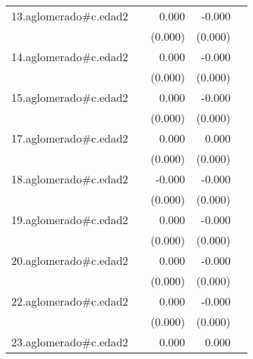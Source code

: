 {\begin{longtable}{l*{4}{D{.}{.}{-1}}}
\addlinespace
13.aglomerado#c.edad2&                     &       0.000         &      -0.000         &                     \\
            &                     &     (0.000)         &     (0.000)         &                     \\
\addlinespace
14.aglomerado#c.edad2&                     &       0.000\sym{*}  &      -0.000         &                     \\
            &                     &     (0.000)         &     (0.000)         &                     \\
\addlinespace
15.aglomerado#c.edad2&                     &       0.000         &      -0.000         &                     \\
            &                     &     (0.000)         &     (0.000)         &                     \\
\addlinespace
17.aglomerado#c.edad2&                     &       0.000         &       0.000         &                     \\
            &                     &     (0.000)         &     (0.000)         &                     \\
\addlinespace
18.aglomerado#c.edad2&                     &      -0.000         &      -0.000\sym{*}  &                     \\
            &                     &     (0.000)         &     (0.000)         &                     \\
\addlinespace
19.aglomerado#c.edad2&                     &       0.000\sym{*}  &      -0.000         &                     \\
            &                     &     (0.000)         &     (0.000)         &                     \\
\addlinespace
20.aglomerado#c.edad2&                     &       0.000         &      -0.000         &                     \\
            &                     &     (0.000)         &     (0.000)         &                     \\
\addlinespace
22.aglomerado#c.edad2&                     &       0.000         &      -0.000         &                     \\
            &                     &     (0.000)         &     (0.000)         &                     \\
\addlinespace
23.aglomerado#c.edad2&                     &       0.000         &       0.000         &                     \\

\end{longtable}}
